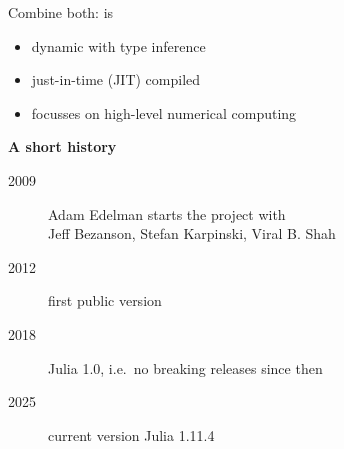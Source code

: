 \documentclass[aspectratio=169, 11pt, handout]{beamer}
\begin{document}
    \begin{frame}{Combine both: }
         is
        \begin{itemize}
            \item dynamic with type inference
            \item just-in-time (JIT) compiled
            \item focusses on high-level numerical computing
        \end{itemize}
        \pause
        \vspace{\baselineskip}
        \textbf{\alert{A short history}}
        \begin{description}
            \item[2009] Adam Edelman starts the project with\\
            Jeff Bezanson, Stefan Karpinski, Viral B. Shah
            \item[2012] first public version
            \item[2018] Julia 1.0, i.e.\, no breaking releases since then
            \item[2025] current version Julia 1.11.4
        \end{description}
    \end{frame}
\end{document}
